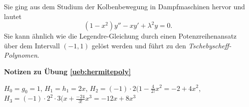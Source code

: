 \documentclass[%
11pt,%
twoside,%
titlepage,%
swissgerman,%
headsepline%
]{scrartcl}
\newcommand{\faReturnGray}{\textcolor{gray}{\faMailReply}} %
\theoremstyle{definition}
\theoremstyle{plain}
\newcommand{\concatueb}[1]{ueb:#1}%
\newcommand{\concatlsg}[1]{lsg:#1}%
\newenvironment{lsg}[1]{%
    \par\noindent\textbf{Notizen zu Übung \ref{\concatueb{#1}}}\label{\concatlsg{#1}}
    \hfill\hyperref[\concatueb{#1}]{\faReturnGray}\par %
}{%
    \par%
}
\begin{document}
Sie ging aus dem Studium der Kolbenbewegung in Dampfmaschinen hervor und lautet
$$(1-x^2)y''-xy'+\lambda^2y=0.$$
Sie kann ähnlich wie die Legendre-Gleichung durch einen Potenzreihenansatz über dem Intervall $(-1,1)$ gelöst werden und führt zu den \emph{Tschebyscheff-Polynomen}.

\begin{lsg}{hermitepoly}
    $H_0=g_0=1$, $H_1=h_1=2x$, $H_2=(-1)\cdot2(1-\frac{4}{2!}x^2=-2+4x^2$, $H_3=(-1)\cdot 2^2\cdot3(x+\frac{-24}{3!}x^3=-12x+8x^3$
\end{lsg}

\cleardoublepage
\listoffigures
%
%
\end{document}
